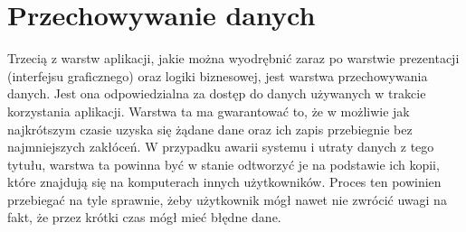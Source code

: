 \section{Przechowywanie danych}
\label{sec:PrzechowywanieDanych}
Trzecią z warstw aplikacji, jakie można wyodrębnić zaraz po warstwie prezentacji (interfejsu graficznego) oraz logiki biznesowej, jest warstwa przechowywania danych. Jest ona odpowiedzialna za dostęp do danych używanych w trakcie korzystania aplikacji. Warstwa ta ma gwarantować to, że w możliwie jak najkrótszym czasie uzyska się żądane dane oraz ich zapis przebiegnie bez najmniejszych zakłóceń. W przypadku awarii systemu i utraty danych z tego tytułu, warstwa ta powinna być w stanie odtworzyć je na podstawie ich kopii, które znajdują się na komputerach innych użytkowników. Proces ten powinien przebiegać na tyle sprawnie, żeby użytkownik mógł nawet nie zwrócić uwagi na fakt, że przez krótki czas mógł mieć błędne dane.

